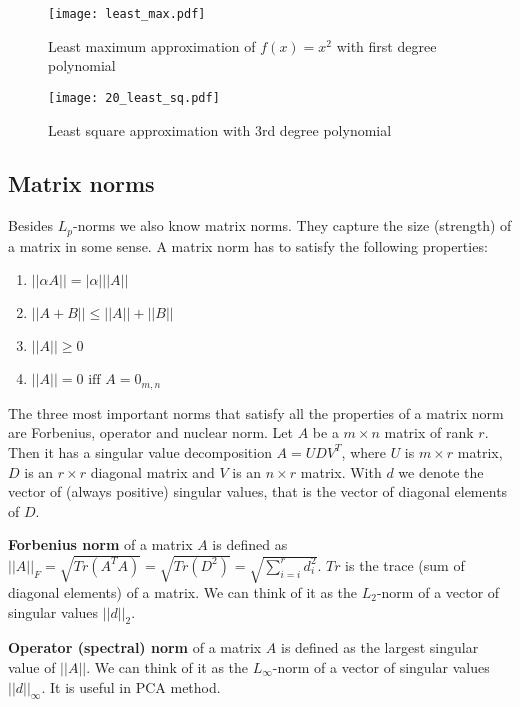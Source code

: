 \documentclass[a4paper,10pt]{article}
\begin{document}
\begin{figure}[h!]
        \begin{minipage}[b]{0.5\linewidth}
            \centering
            \texttt{[image: least\_max.pdf]}
            \caption{Least maximum approximation of $f(x)=x^2$ with first degree polynomial}
            \label{minmax}
        \end{minipage}
        \hspace{0.5cm}
        \begin{minipage}[b]{0.5\linewidth}
            \centering
            \texttt{[image: 20\_least\_sq.pdf]}
            \caption{Least square approximation with 3rd degree polynomial}
            \label{osnlsq}
        \end{minipage}
    \end{figure}

\newpage
\subsection*{Matrix norms}
Besides $L_p$-norms we also know matrix norms. They capture the size (strength) of a matrix in some sense. A matrix norm has to satisfy the following properties:
\begin{enumerate}
\item{$||\alpha A||=|\alpha| ||A||$}
\item{$||A+B||\leq ||A||+||B||$}
\item{$||A||\geq0$}
\item{$||A||=0 \text{ iff } A=0_{m,n}$}
\end{enumerate}
The three most important norms that satisfy all the properties of a matrix norm are Forbenius, operator and nuclear norm. Let $A$ be a $m\times n$ matrix of rank $r$. Then it has a singular value decomposition $A=UDV^T$, where $U$ is $m\times r$ matrix, $D$ is an $r\times r$ diagonal matrix and $V$ is an $n\times r$ matrix. With $d$ we denote the vector of (always positive) singular values, that is the vector of diagonal elements of $D$.

\textbf{Forbenius norm} of a matrix $A$ is defined as $||A||_F=\sqrt{Tr(A^TA)}=\sqrt{Tr(D^2)}=\sqrt{\sum_{i=i}^rd_i^2}$. $Tr$ is the trace (sum of diagonal elements) of a matrix. We can think of it as the $L_2$-norm of a vector of singular values $||d||_2$.

\textbf{Operator (spectral) norm} of a matrix $A$ is defined as the largest singular value of $||A||$. We can think of it as the $L_\infty$-norm of a vector of singular values $||d||_\infty$. It is useful in PCA method.
\end{document}
